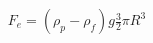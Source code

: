 \documentclass[preview]{standalone}
\begin{document}
\begin{align*}
F_e = (\rho_p - \rho_f)g\frac{3}{2} \pi R^3
\end{align*}
\end{document}
